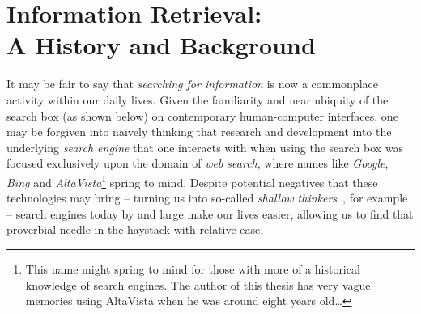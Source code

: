 
\chapter[Information Retrieval]{Information Retrieval:\\A History and Background}\label{chap:ir_background}
It may be fair to say that \emph{searching for information} is now a commonplace activity within our daily lives. Given the familiarity and near ubiquity of the search box (as shown below) on contemporary human-computer interfaces, one may be forgiven into na\"{i}vely thinking that research and development into the underlying \emph{search engine} that one interacts with when using the search box was focused exclusively upon the domain of \emph{web search}, where names like \emph{Google}, \emph{Bing} and \emph{AltaVista}\footnote{This name might spring to mind for those with more of a historical knowledge of search engines. The author of this thesis has very vague memories using AltaVista when he was around eight years old\dots} spring to mind. Despite potential negatives that these technologies may bring -- turning us into so-called \emph{shallow thinkers}~\citep{carr2008google_stupid}, for example -- search engines today by and large make our lives easier, allowing us to find that proverbial needle in the haystack with relative ease.

\begin{figure}[h]
    \centering
    \vspace{4mm}
    \label{fig:searchbox}
    \vspace{-5mm}
\end{figure}

